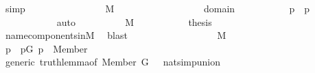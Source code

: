 \begin{isabellebody}
\ simp\isanewline
\ \ \ \ \ \ \isamarkupfalse%
\ \isanewline
\ \ \ \ \ \ \isamarkupfalse%
\ {\isachardoublequoteopen}{\isasymsigma}{\isasymin}M{\isachardoublequoteclose}\isanewline
\ \ \ \ \ \ \isamarkupfalse%
\ {\isacharminus}{\kern0pt}\isanewline
\ \ \ \ \ \ \ \ \isamarkupfalse%
\ {\isacartoucheopen}{\isasymsigma}{\isasymin}domain{\isacharparenleft}{\kern0pt}{\isasymtau}{\isacharparenright}{\kern0pt}{\isacartoucheclose}\ \isanewline
\ \ \ \ \ \ \ \ \isamarkupfalse%
\ p\ \ {\isachardoublequoteopen}{\isacharless}{\kern0pt}{\isasymsigma}{\isacharcomma}{\kern0pt}p{\isachargreater}{\kern0pt}\ {\isasymin}\ {\isasymtau}{\isachardoublequoteclose}\isanewline
\ \ \ \ \ \ \ \ \ \ \isamarkupfalse%
\ auto\isanewline
\ \ \ \ \ \ \ \ \isamarkupfalse%
\ {\isacartoucheopen}{\isasymtau}{\isasymin}M{\isacartoucheclose}\ \isanewline
\ \ \ \ \ \ \ \ \isamarkupfalse%
\ {\isacharquery}{\kern0pt}thesis\isanewline
\ \ \ \ \ \ \ \ \ \ \isamarkupfalse%
\ name{\isacharunderscore}{\kern0pt}components{\isacharunderscore}{\kern0pt}in{\isacharunderscore}{\kern0pt}M\ \isamarkupfalse%
\ blast\isanewline
\ \ \ \ \ \ \isamarkupfalse%
\isanewline
\ \ \ \ \ \ \isamarkupfalse%
\ \isamarkupfalse%
\ {\isacartoucheopen}{\isasymchi}\ {\isasymin}\ M{\isacartoucheclose}\isanewline
\ \ \ \ \ \ \isamarkupfalse%
\ \isanewline
\ \ \ \ \ \ \isamarkupfalse%
\ p\ \ {\isachardoublequoteopen}p{\isasymin}G{\isachardoublequoteclose}\ {\isachardoublequoteopen}{\isacharparenleft}{\kern0pt}p\ {\isasymtturnstile}\ Member{\isacharparenleft}{\kern0pt}{}{\isacharcomma}{\kern0pt}{}{\isacharparenright}{\kern0pt}\ {\isacharbrackleft}{\kern0pt}{\isasymsigma}{\isacharcomma}{\kern0pt}{\isasymchi}{\isacharbrackright}{\kern0pt}{\isacharparenright}{\kern0pt}{\isachardoublequoteclose}\isanewline
\ \ \ \ \ \ \ \ \isamarkupfalse%
\ generic\ truth{\isacharunderscore}{\kern0pt}lemma{\isacharbrackleft}{\kern0pt}of\ {\isachardoublequoteopen}Member{\isacharparenleft}{\kern0pt}{}{\isacharcomma}{\kern0pt}{}{\isacharparenright}{\kern0pt}{\isachardoublequoteclose}\ {\isachardoublequoteopen}G{\isachardoublequoteclose}\ {\isachardoublequoteopen}{\isacharbrackleft}{\kern0pt}{\isasymsigma}{\isacharcomma}{\kern0pt}{\isasymchi}{\isacharbrackright}{\kern0pt}{\isachardoublequoteclose}\ {\isacharbrackright}{\kern0pt}\ nat{\isacharunderscore}{\kern0pt}simp{\isacharunderscore}{\kern0pt}union\isanewline

\end{isabellebody}
